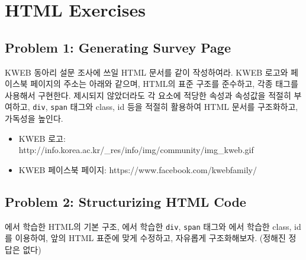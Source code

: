 \section{HTML Exercises} \label{sect:html-exercises}

\subsection*{Problem 1: Generating Survey Page}

KWEB 동아리 설문 조사에 쓰일 HTML 문서를 \와 같이 작성하여라. KWEB 로고와 페이스북 페이지의 주소는 아래와 같으며, HTML의 표준 구조를 준수하고, 각종 태그를 사용해서 구현한다. 제시되지 않았더라도 각 요소에 적당한 속성과 속성값을 적절히 부여하고, \texttt{div}, \texttt{span} 태그와 class, id 등을 적절히 활용하여 HTML 문서를 구조화하고, 가독성을 높인다.

\begin{itemize}
    \item KWEB 로고: http://info.korea.ac.kr/\_res/info/img/community/img\_kweb.gif
    \item KWEB 페이스북 페이지: https://www.facebook.com/kwebfamily/
\end{itemize}

    {}

\subsection*{Problem 2: Structurizing HTML Code}

에서 학습한 HTML의 기본 구조, 에서 학습한 \texttt{div}, \texttt{span} 태그와 에서 학습한 class, id를 이용하여, 앞의 \를 HTML 표준에 맞게 수정하고, 자유롭게 구조화해보자. (정해진 정답은 없다) 
